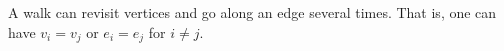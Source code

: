 

\setcounter{section}{1}
\setcounter{subsection}{5}
\setcounter{dfn}{14}

\begin{rem}
A walk can revisit vertices and go along an edge several times.
That is, one can have $v_i = v_j$ or $e_i = e_j$ for $i \ne j$.
\end{rem}



